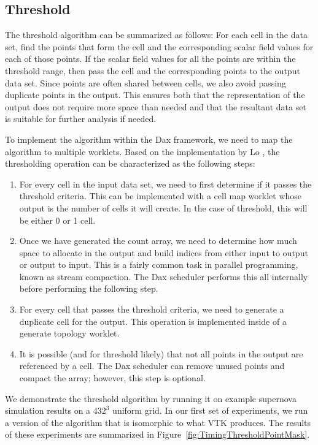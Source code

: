 \subsection{Threshold}

The threshold algorithm can be summarized as follows: For each cell in the
data set, find the points that form the cell and the corresponding scalar
field values for each of those points. If the scalar field values for all
the points are within the threshold range, then pass the cell and the
corresponding points to the output data set. Since points are often shared
between cells, we also avoid passing duplicate points in the output. This
ensures both that the representation of the output does not require more
space than needed and that the resultant data set is suitable for further
analysis if needed.

To implement the algorithm within the Dax framework, we need to map the
algorithm to multiple worklets. Based on the implementation by Lo
\etal{}, the thresholding operation can be characterized as the
following steps:

\begin{enumerate}
\item For every cell in the input data set, we need to first determine if it
  passes the threshold criteria. This can be implemented with a cell map
  worklet whose output is the number of cells it will create. In the case
  of threshold, this will be either 0 or 1 cell.
\item Once we have generated the count array, we need to determine how much
  space to allocate in the output and build indices from either input to
  output or output to input. This is a fairly common task in parallel
  programming, known as stream compaction. The Dax scheduler performs this
  all internally before performing the following step.
\item For every cell that passes the threshold criteria, we need to
  generate a duplicate cell for the output. This operation is implemented
  inside of a generate topology worklet.
\item It is possible (and for threshold likely) that not all points in the
  output are referenced by a cell. The Dax scheduler can remove unused
  points and compact the array; however, this step is optional.
\end{enumerate}

We demonstrate the threshold algorithm by running it on example supernova
simulation results on a $432^3$ uniform grid. In our first set of
experiments, we run a version of the algorithm that is isomorphic to what
VTK produces. The results of these experiments are summarized in
Figure~\ref{fig:TimingThresholdPointMask}.

